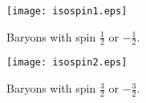 \begin{figure}\begin{center}
\texttt{[image: isospin1.eps]}
\caption{Baryons with spin $\frac{1}{2}$ or $-\frac{1}{2}$.}\label{fig:isospin1}
\end{center}\end{figure}

\begin{figure}\begin{center}
\texttt{[image: isospin2.eps]}
\caption{Baryons with spin $\frac{3}{2}$ or $-\frac{3}{2}$.}\label{fig:isospin2}
\end{center}\end{figure}




